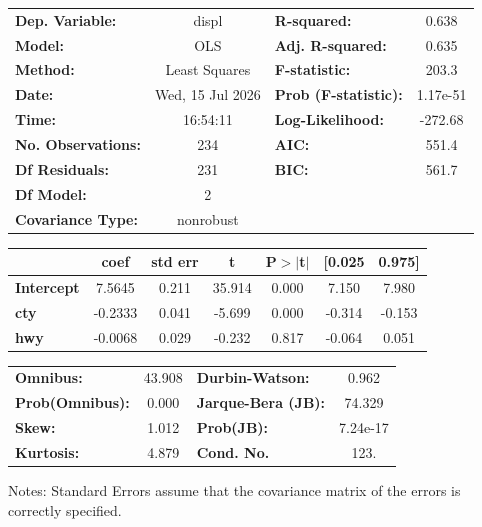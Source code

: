\begin{center}
\begin{tabular}{lclc}
\toprule
\textbf{Dep. Variable:}    &      displ       & \textbf{  R-squared:         } &     0.638   \\
\textbf{Model:}            &       OLS        & \textbf{  Adj. R-squared:    } &     0.635   \\
\textbf{Method:}           &  Least Squares   & \textbf{  F-statistic:       } &     203.3   \\
\textbf{Date:}             & Wed, 15 Jul 2026 & \textbf{  Prob (F-statistic):} &  1.17e-51   \\
\textbf{Time:}             &     16:54:11     & \textbf{  Log-Likelihood:    } &   -272.68   \\
\textbf{No. Observations:} &         234      & \textbf{  AIC:               } &     551.4   \\
\textbf{Df Residuals:}     &         231      & \textbf{  BIC:               } &     561.7   \\
\textbf{Df Model:}         &           2      & \textbf{                     } &             \\
\textbf{Covariance Type:}  &    nonrobust     & \textbf{                     } &             \\
\bottomrule
\end{tabular}
\begin{tabular}{lcccccc}
                   & \textbf{coef} & \textbf{std err} & \textbf{t} & \textbf{P$> |$t$|$} & \textbf{[0.025} & \textbf{0.975]}  \\
\midrule
\textbf{Intercept} &       7.5645  &        0.211     &    35.914  &         0.000        &        7.150    &        7.980     \\
\textbf{cty}       &      -0.2333  &        0.041     &    -5.699  &         0.000        &       -0.314    &       -0.153     \\
\textbf{hwy}       &      -0.0068  &        0.029     &    -0.232  &         0.817        &       -0.064    &        0.051     \\
\bottomrule
\end{tabular}
\begin{tabular}{lclc}
\textbf{Omnibus:}       & 43.908 & \textbf{  Durbin-Watson:     } &    0.962  \\
\textbf{Prob(Omnibus):} &  0.000 & \textbf{  Jarque-Bera (JB):  } &   74.329  \\
\textbf{Skew:}          &  1.012 & \textbf{  Prob(JB):          } & 7.24e-17  \\
\textbf{Kurtosis:}      &  4.879 & \textbf{  Cond. No.          } &     123.  \\
\bottomrule
\end{tabular}
\end{center}

Notes: \newline
 [1] Standard Errors assume that the covariance matrix of the errors is correctly specified.